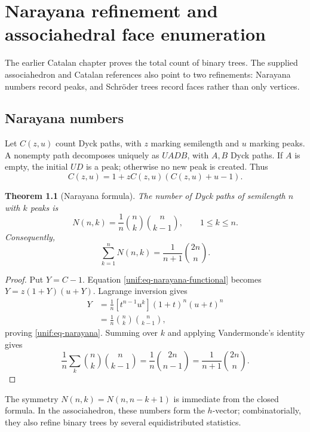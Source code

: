 \documentclass[11pt,a4paper,oneside,openany]{book}
\newtheorem{theorem}{Theorem}[chapter]
\theoremstyle{definition}
\theoremstyle{remark}
\begin{document}
\chapter{Narayana refinement and associahedral face enumeration}

The earlier Catalan chapter proves the total count of binary trees. The
supplied associahedron and Catalan references also point to two refinements:
Narayana numbers record peaks, and Schr\"oder trees record faces rather than
only vertices.

\section{Narayana numbers}

Let $C(z,u)$ count Dyck paths, with $z$ marking semilength and $u$ marking
peaks. A nonempty path decomposes uniquely as $UADB$, with $A,B$ Dyck paths.
If $A$ is empty, the initial $UD$ is a peak; otherwise no new peak is created.
Thus
\begin{equation}\label{unif:eq-narayana-functional}
 C(z,u)=1+zC(z,u)(C(z,u)+u-1).
\end{equation}

\begin{theorem}[Narayana formula]
\label{unif:thm-narayana}
The number of Dyck paths of semilength $n$ with $k$ peaks is
\begin{equation}\label{unif:eq-narayana}
 N(n,k)=\frac1n\binom nk\binom n{k-1},
 \qquad1\le k\le n.
\end{equation}
Consequently,
\begin{equation}\label{unif:eq-narayana-catalan}
 \sum_{k=1}^{n}N(n,k)=\frac1{n+1}\binom{2n}{n}.
\end{equation}
\end{theorem}
\begin{proof}
Put $Y=C-1$. Equation \eqref{unif:eq-narayana-functional} becomes
$Y=z(1+Y)(u+Y)$. Lagrange inversion gives
\begin{align*}
 [z^nu^k]Y
 &=\frac1n[t^{n-1}u^k](1+t)^n(u+t)^n\\
 &=\frac1n\binom nk\binom n{k-1},
\end{align*}
proving \eqref{unif:eq-narayana}. Summing over $k$ and applying Vandermonde's
identity gives
\[
 \frac1n\sum_k\binom nk\binom n{k-1}
 =\frac1n\binom{2n}{n-1}=\frac1{n+1}\binom{2n}{n}.
\]
\end{proof}

The symmetry $N(n,k)=N(n,n-k+1)$ is immediate from the closed formula. In the
associahedron, these numbers form the $h$-vector; combinatorially, they also
refine binary trees by several equidistributed statistics.
\end{document}
